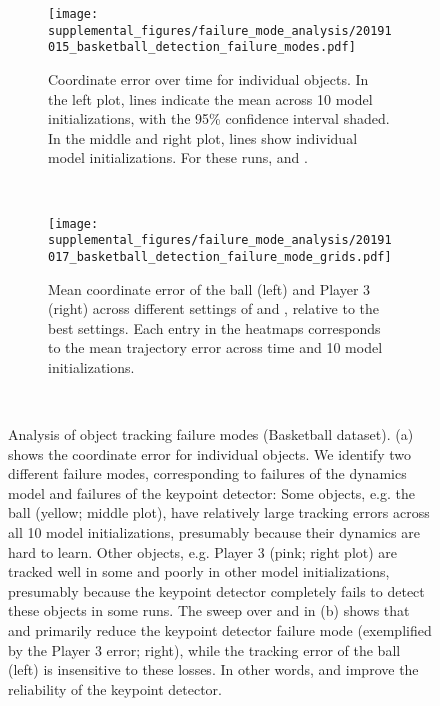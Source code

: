 \begin{figure*}[t]
    \centering
    \begin{subfigure}[t]{0.8\textwidth}
        \texttt{[image: supplemental\_figures/failure\_mode\_analysis/20191015\_basketball\_detection\_failure\_modes.pdf]}
        \caption{Coordinate error over time for individual objects. In the left plot, lines indicate the mean across 10 model initializations, with the 95\% confidence interval shaded. In the middle and right plot, lines show individual model initializations. For these runs,  and .}
    \end{subfigure}\\
    \vspace{0.2in}
    \begin{subfigure}[t]{0.8\textwidth}
        \centering
        \texttt{[image: supplemental\_figures/failure\_mode\_analysis/20191017\_basketball\_detection\_failure\_mode\_grids.pdf]}
        \caption{Mean coordinate error of the ball (left) and Player 3 (right) across different settings of  and , relative to the best settings. Each entry in the heatmaps corresponds to the mean trajectory error across time and 10 model initializations.}
    \end{subfigure}\\
    
    \caption{Analysis of object tracking failure modes (Basketball dataset). (a) shows the coordinate error for individual objects. We identify two different failure modes, corresponding to failures of the dynamics model and failures of the keypoint detector: Some objects, e.g. the ball (yellow; middle plot), have relatively large tracking errors across all 10 model initializations, presumably because their dynamics are hard to learn. Other objects, e.g. Player 3 (pink; right plot) are tracked well in some and poorly in other model initializations, presumably because the keypoint detector completely fails to detect these objects in some runs. The sweep over  and  in (b) shows that  and  primarily reduce the keypoint detector failure mode (exemplified by the Player 3 error; right), while the tracking error of the ball (left) is insensitive to these losses. In other words,  and  improve the reliability of the keypoint detector.}
    \label{fig:failure_mode_analysis}
\end{figure*} 